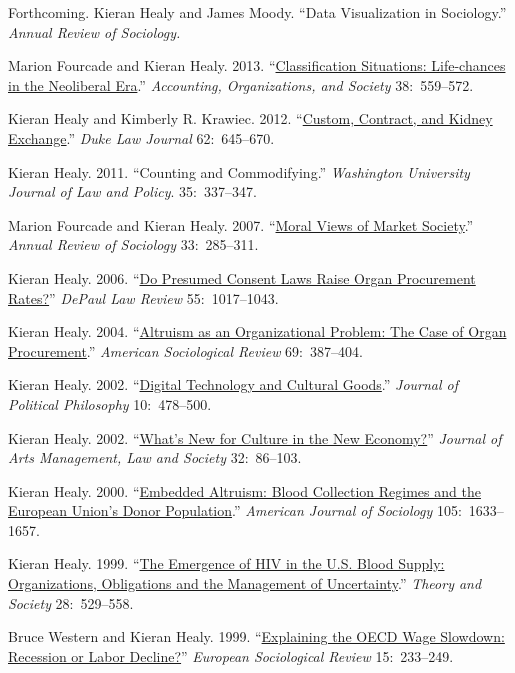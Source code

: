 \documentclass[11pt,oneside,a4paper,DIV=8]{scrartcl}
\begin{document}
Forthcoming. Kieran Healy and James Moody. ``Data Visualization in Sociology.'' \emph{Annual Review of Sociology.}

Marion Fourcade and Kieran Healy. 2013. ``\href{http://kieranhealy.org/files/papers/classification-situations.pdf}{Classification Situations: Life-chances in the Neoliberal Era}.'' \emph{Accounting, Organizations, and Society} 38:~559--572.

Kieran Healy and Kimberly R. Krawiec. 2012. ``\href{http://kieranhealy.org/files/papers/custom-contract-kidney.pdf}{Custom, Contract, and Kidney Exchange}.'' \emph{Duke Law Journal} 62:~645--670. 

Kieran Healy. 2011. ``Counting and Commodifying.'' \emph{Washington University Journal of Law and Policy}. 35:~337--347.

Marion Fourcade and Kieran Healy. 2007. ``\href{http://arjournals.annualreviews.org/doi/pdf/10.1146/annurev.soc.33.040406.131642}{Moral Views of Market Society}.'' \emph{Annual Review of Sociology} 33:~285--311. 

Kieran Healy. 2006. ``\href{http://www.kieranhealy.org/files/papers/presumed-consent.pdf}{Do Presumed Consent Laws Raise Organ Procurement Rates?}'' \emph{DePaul Law Review} 55:~1017--1043. 

Kieran Healy. 2004. ``\href{http://www.kieranhealy.org/files/papers/asr2004.pdf}{Altruism as an Organizational Problem: The Case of Organ Procurement}.''
 \emph{American Sociological Review} 69:~387--404.

Kieran Healy. 2002. ``\href{http://www.kieranhealy.org/files/papers/jpp.pdf}{Digital Technology and Cultural Goods}.'' \emph{Journal of
  Political Philosophy} 10:~478--500. 

Kieran Healy. 2002. ``\href{http://www.kieranhealy.org/files/papers/culture-newecon.pdf}{What's New for Culture in the New Economy?}'' \emph{Journal
  of Arts Management, Law and Society} 32:~86--103. 


Kieran Healy. 2000. ``\href{http://www.kieranhealy.org/files/papers/embed-alt.pdf}{Embedded Altruism: Blood Collection Regimes and the European
  Union's Donor Population}.'' \emph{American Journal of Sociology} 105:~1633--1657.


Kieran Healy. 1999.  ``\href{http://www.kieranhealy.org/files/papers/ts.pdf}{The Emergence of HIV in the U.S. Blood Supply: Organizations,
  Obligations and the Management of Uncertainty}.'' \emph{Theory and Society} 28:~529--558.


Bruce Western and Kieran Healy. 1999. ``\href{http://www.kieranhealy.org/files/papers/western-healy99.pdf}{Explaining the OECD Wage Slowdown:
Recession or Labor Decline?}''  \emph{European Sociological Review}
15:~233--249.
\end{document}
